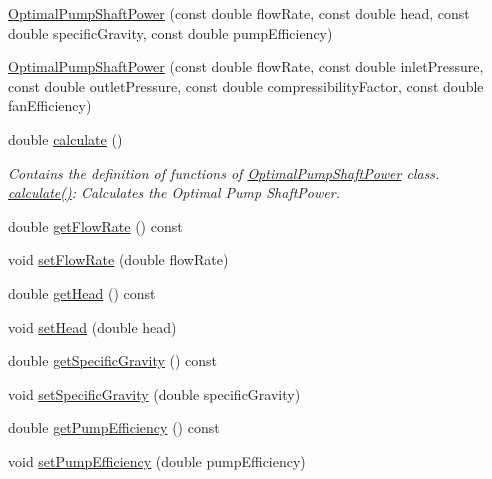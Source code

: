 \begin{DoxyCompactItemize}
\item 
\hyperlink{class_optimal_pump_shaft_power_a40e47716e0c8ecab5deb9eae4c8f9bd0}{Optimal\+Pump\+Shaft\+Power} (const double flow\+Rate, const double head, const double specific\+Gravity, const double pump\+Efficiency)
\item 
\hyperlink{class_optimal_pump_shaft_power_a322ac55881a0170cd4042fcf8a6a9eab}{Optimal\+Pump\+Shaft\+Power} (const double flow\+Rate, const double inlet\+Pressure, const double outlet\+Pressure, const double compressibility\+Factor, const double fan\+Efficiency)
\item 
double \hyperlink{class_optimal_pump_shaft_power_a23ab040eea0a9e0431988bd353076237}{calculate} ()
\begin{DoxyCompactList}\small\item\em Contains the definition of functions of \hyperlink{class_optimal_pump_shaft_power}{Optimal\+Pump\+Shaft\+Power} class. \hyperlink{class_optimal_pump_shaft_power_a23ab040eea0a9e0431988bd353076237}{calculate()}\+: Calculates the Optimal Pump Shaft\+Power. \end{DoxyCompactList}\item 
double \hyperlink{class_optimal_pump_shaft_power_a8c1532459a196347f7d5219d4690a490}{get\+Flow\+Rate} () const
\item 
void \hyperlink{class_optimal_pump_shaft_power_a38efdee39db4c3856915f1ab26d44ed2}{set\+Flow\+Rate} (double flow\+Rate)
\item 
double \hyperlink{class_optimal_pump_shaft_power_abb285a8a256c10187113c34db1a4462b}{get\+Head} () const
\item 
void \hyperlink{class_optimal_pump_shaft_power_aa080c62ff92fc70a4e27e7710e490b62}{set\+Head} (double head)
\item 
double \hyperlink{class_optimal_pump_shaft_power_a607d32c56edece639e03007adc1bf325}{get\+Specific\+Gravity} () const
\item 
void \hyperlink{class_optimal_pump_shaft_power_aa565a332e4b144c8eb85fd06c541199e}{set\+Specific\+Gravity} (double specific\+Gravity)
\item 
double \hyperlink{class_optimal_pump_shaft_power_a77b9c639438f9d6008c20948f173a2c4}{get\+Pump\+Efficiency} () const
\item 
void \hyperlink{class_optimal_pump_shaft_power_a2cb2c6b537c7db0bc5071f09c66308d0}{set\+Pump\+Efficiency} (double pump\+Efficiency)
\end{DoxyCompactItemize}


